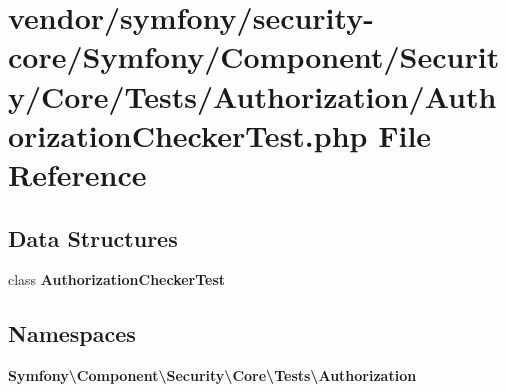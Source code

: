 \section{vendor/symfony/security-\/core/\+Symfony/\+Component/\+Security/\+Core/\+Tests/\+Authorization/\+Authorization\+Checker\+Test.php File Reference}
\label{_authorization_checker_test_8php}
\subsection*{Data Structures}
\begin{DoxyCompactItemize}
\item 
class {\bf Authorization\+Checker\+Test}
\end{DoxyCompactItemize}
\subsection*{Namespaces}
\begin{DoxyCompactItemize}
\item 
 {\bf Symfony\textbackslash{}\+Component\textbackslash{}\+Security\textbackslash{}\+Core\textbackslash{}\+Tests\textbackslash{}\+Authorization}
\end{DoxyCompactItemize}
